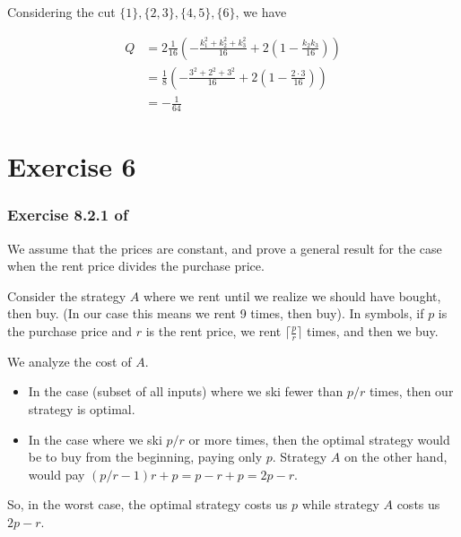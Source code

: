 \documentclass{article}
\begin{document}
Considering the cut \(\{1\}, \{2,3\}, \{4,5\}, \{6\}\), we have

\begin{align*}
    Q &= 2 \frac{1}{16}
        \left(
            -\frac{k_1^2 + k_2^2 + k_3^2}{16}
            + 2 \left( 1 - \frac{k_2 k_3}{16} \right)
         \right)\\
      &= \frac{1}{8}
      \left(
        -\frac{3^2 + 2^2 + 3^2}{16}
        + 2 \left( 1 - \frac{2 \cdot 3}{16} \right)
     \right)\\
     &= -\frac{1}{64}
\end{align*}


\section*{Exercise 6}

\subsubsection*{Exercise 8.2.1 of \cite{mmds}}


We assume that the prices are constant, and prove a general result
for the case when the rent price divides the purchase price.

Consider the strategy \(A\) where
we rent until we realize we should have bought, then buy.
(In our case this means we rent 9 times, then buy).
In symbols, if \(p\) is the purchase price and \(r\) is the rent price,
we rent \(\lceil \frac{p}{r} \rceil\) times, and then we buy.

We analyze the cost of \(A\).

\begin{itemize}
    \item In the case (subset of all inputs) where we ski
        fewer than \(p / r\) times, then our strategy is optimal.
    \item In the case where we ski \(p / r\) or more times,
        then the optimal strategy would be to buy from the beginning,
        paying only \(p\).
        Strategy \(A\) on the other hand, would pay
        \((p/r - 1) r + p = p - r + p = 2p - r\).
\end{itemize}

So, in the worst case, the optimal strategy costs us \(p\)
while strategy \(A\) costs us \(2p - r\).
\end{document}
